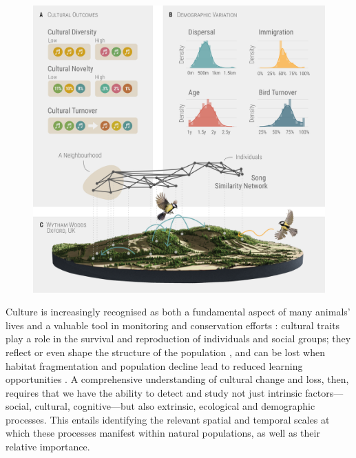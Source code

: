\documentclass[9pt, twocolumn, twoside]{gsajnl}
\begin{document}
\begin{figure}[!ht]
    \centering
    \includegraphics[width=\linewidth]{figures/chapter_4/FIG1.pdf}
    \label{c4_fig:main}
\end{figure}

Culture is increasingly recognised as both a fundamental aspect of many animals' lives and a valuable tool in monitoring and conservation efforts \parencite{brakes2019, brakes2021}: cultural traits play a role in the survival and reproduction of individuals and social groups; they reflect or even shape the structure of the population \parencite{brakes2019}, and can be lost when habitat fragmentation and population decline lead to reduced learning opportunities \parencite{paxton2019, crates2021}. A comprehensive understanding of cultural change and loss, then, requires that we have the ability to detect and study not just intrinsic factors---social, cultural, cognitive---but also extrinsic, ecological and demographic processes. This entails identifying the relevant spatial and temporal scales at which these processes manifest within natural populations, as well as their relative importance.
\end{document}
